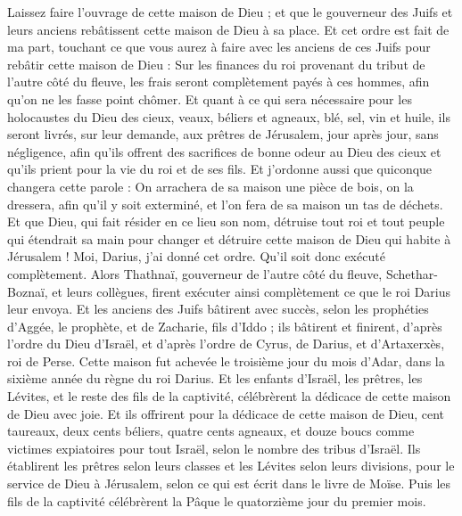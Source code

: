 \begin{multicols}{2}
Laissez faire l'ouvrage de cette maison de Dieu ; et que le gouverneur des Juifs et leurs anciens rebâtissent cette maison de Dieu à sa place.
Et cet ordre est fait de ma part, touchant ce que vous aurez à faire avec les anciens de ces Juifs pour rebâtir cette maison de Dieu : Sur les finances du roi provenant du tribut de l'autre côté du fleuve, les frais seront complètement payés à ces hommes, afin qu'on ne les fasse point chômer.
Et quant à ce qui sera nécessaire pour les holocaustes du Dieu des cieux, veaux, béliers et agneaux, blé, sel, vin et huile, ils seront livrés, sur leur demande, aux prêtres de Jérusalem, jour après jour, sans négligence,
afin qu'ils offrent des sacrifices de bonne odeur au Dieu des cieux et qu'ils prient pour la vie du roi et de ses fils.
Et j'ordonne aussi que quiconque changera cette parole : On arrachera de sa maison une pièce de bois, on la dressera, afin qu'il y soit exterminé, et l'on fera de sa maison un tas de déchets.
Et que Dieu, qui fait résider en ce lieu son nom, détruise tout roi et tout peuple qui étendrait sa main pour changer et détruire cette maison de Dieu qui habite à Jérusalem ! Moi, Darius, j'ai donné cet ordre. Qu'il soit donc exécuté complètement.
Alors Thathnaï, gouverneur de l'autre côté du fleuve, Schethar-Boznaï, et leurs collègues, firent exécuter ainsi complètement ce que le roi Darius leur envoya.
Et les anciens des Juifs bâtirent avec succès, selon les prophéties d'Aggée, le prophète, et de Zacharie, fils d'Iddo ; ils bâtirent et finirent, d'après l'ordre du Dieu d'Israël, et d'après l'ordre de Cyrus, de Darius, et d'Artaxerxès, roi de Perse.
Cette maison fut achevée le troisième jour du mois d'Adar, dans la sixième année du règne du roi Darius.
Et les enfants d'Israël, les prêtres, les Lévites, et le reste des fils de la captivité, célébrèrent la dédicace de cette maison de Dieu avec joie.
Et ils offrirent pour la dédicace de cette maison de Dieu, cent taureaux, deux cents béliers, quatre cents agneaux, et douze boucs comme victimes expiatoires pour tout Israël, selon le nombre des tribus d'Israël.
Ils établirent les prêtres selon leurs classes et les Lévites selon leurs divisions, pour le service de Dieu à Jérusalem, selon ce qui est écrit dans le livre de Moïse.
Puis les fils de la captivité célébrèrent la Pâque le quatorzième jour du premier mois.

\end{multicols}
